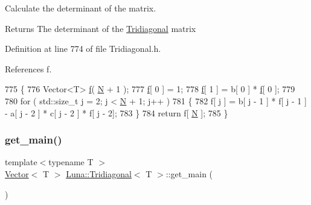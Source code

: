 Calculate the determinant of the matrix. 

\begin{DoxyReturn}{Returns}
The determinant of the \hyperlink{classLuna_1_1Tridiagonal}{Tridiagonal} matrix 
\end{DoxyReturn}


Definition at line 774 of file Tridiagonal.\+h.



References f.


\begin{DoxyCode}
775   \{
776     Vector<T> \hyperlink{Nonlinear__ODE__BVP_8cpp_a06fc87d81c62e9abb8790b6e5713c55ba7ce756344023b99e5ab27b804feb765c}{f}( \hyperlink{namespaceHeat__plot_a7d050092798e28458a263710837bda77}{N} + 1 );
777     \hyperlink{Nonlinear__ODE__BVP_8cpp_a06fc87d81c62e9abb8790b6e5713c55ba7ce756344023b99e5ab27b804feb765c}{f}[ 0 ] = 1;
778     \hyperlink{Nonlinear__ODE__BVP_8cpp_a06fc87d81c62e9abb8790b6e5713c55ba7ce756344023b99e5ab27b804feb765c}{f}[ 1 ] = b[ 0 ] * \hyperlink{Nonlinear__ODE__BVP_8cpp_a06fc87d81c62e9abb8790b6e5713c55ba7ce756344023b99e5ab27b804feb765c}{f}[ 0 ];
779 
780     \textcolor{keywordflow}{for} ( std::size\_t j = 2; j < \hyperlink{namespaceHeat__plot_a7d050092798e28458a263710837bda77}{N} + 1; j++ )
781     \{
782       f[ j ] = b[ j - 1 ] * f[ j - 1 ] - a[ j - 2 ] * c[ j - 2 ] * f[ j - 2];
783     \}
784     \textcolor{keywordflow}{return} f[ \hyperlink{namespaceHeat__plot_a7d050092798e28458a263710837bda77}{N} ];
785   \}
\end{DoxyCode}
\mbox{\label{classLuna_1_1Tridiagonal_ac95e35aacc68963b5889f0cf6c838315}} 
\subsubsection{\texorpdfstring{get\+\_\+main()}{get\_main()}}
{\footnotesize\ttfamily template$<$typename T $>$ \\
\hyperlink{classLuna_1_1Vector}{Vector}$<$ T $>$ \hyperlink{classLuna_1_1Tridiagonal}{Luna\+::\+Tridiagonal}$<$ T $>$\+::get\+\_\+main (\begin{DoxyParamCaption}{ }\end{DoxyParamCaption})\hspace{0.3cm}{\ttfamily [inline]}}



